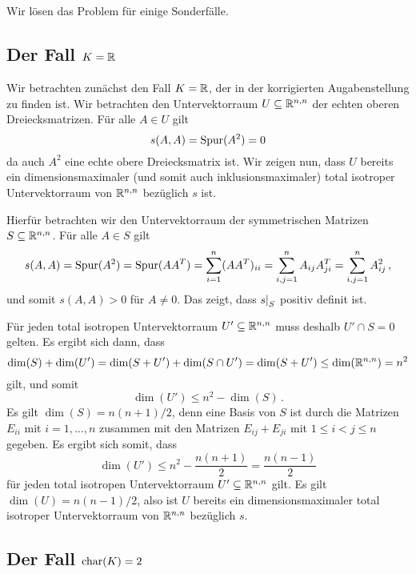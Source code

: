 \section{}

Wir lösen das Problem für einige Sonderfälle.


\subsection*{Der Fall $K = \mathbb{R}$}

Wir betrachten zunächst den Fall $K = \mathbb{R}$, der in der korrigierten Augabenstellung zu finden ist.
Wir betrachten den Untervektorraum $U \subseteq \mathbb{R}^{n, n}$ der echten oberen Dreiecksmatrizen.
Für alle $A \in U$ gilt
\[
    s(A,A)
  = \operatorname{Spur}(A^2)
  = 0
\]
da auch $A^2$ eine echte obere Dreiecksmatrix ist.
Wir zeigen nun, dass $U$ bereits ein dimensionsmaximaler (und somit auch inklusionsmaximaler) total isotroper Untervektorraum von $\mathbb{R}^{n, n}$ bezüglich $s$ ist.

Hierfür betrachten wir den Untervektorraum der symmetrischen Matrizen $S \subseteq \mathbb{R}^{n, n}$.
Für alle $A \in S$ gilt
\[
    s(A,A)
  = \operatorname{Spur}(A^2)
  = \operatorname{Spur}(A A^T)
  = \sum_{i=1}^n (A A^T)_{ii}
  = \sum_{i,j=1}^n A_{ij} A^T_{ji}
  = \sum_{i,j=1}^n A_{ij}^2 \,,
\]
und somit $s(A,A) > 0$ für $A \neq 0$.
Das zeigt, dass $\restrict{s}{S}$ positiv definit ist.

Für jeden total isotropen Untervektorraum $U' \subseteq \mathbb{R}^{n, n}$ muss deshalb $U' \cap S = 0$ gelten.
Es ergibt sich dann, dass
\[
        \dim(S) + \dim(U')
  =     \dim(S + U') + \dim(S \cap U')
  =     \dim(S + U')
  \leq  \dim(\mathbb{R}^{n, n})
  =     n^2
\]
gilt, und somit
\[
        \dim(U') 
  \leq  n^2 - \dim(S) \,.
\]
Es gilt $\dim(S) = n(n+1)/2$, denn eine Basis von $S$ ist durch die Matrizen $E_{ii}$ mit $i = 1, \dotsc, n$ zusammen mit den Matrizen $E_{ij} + E_{ji}$ mit $1 \leq i < j \leq n$ gegeben.
Es ergibt sich somit, dass
\[
        \dim(U')
  \leq  n^2 - \frac{n(n+1)}{2}
  =     \frac{n(n-1)}{2}
\]
für jeden total isotropen Untervektorraum $U' \subseteq \mathbb{R}^{n, n}$ gilt.
Es gilt $\dim(U) = n(n-1)/2$, also ist $U$ bereits ein dimensionsmaximaler total isotroper Untervektorraum von $\mathbb{R}^{n, n}$ bezüglich $s$.





\subsection*{Der Fall $\operatorname{char}(K) = 2$}

